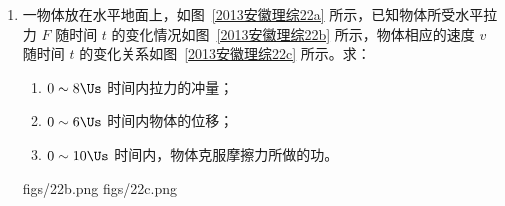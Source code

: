 \documentclass[\gkver]{gaokaozhenti}
\begin{document}
\begin{enumerate}
{（2）按照电路图连接电路如图。


Ⅲ．（1）由图 2 发现在拟合的过程中，80.00 的数据点误差太大，故应剔除。

（2）拟合作图如图所示。


（3）用较远的两点得图线斜率 $k=\frac{1.50-0.70}{180-0}=0.00444$，由闭合电路欧姆定律知 $E_{n}=U_{12}+\frac{U_{12}}{R_0}(R+r)$ 可得 $\frac{1}{U_{12}}=\frac{1}{E_n}+\frac{r}{E_nR_0}+\frac{1}{E_nR_0}R$，所以 $k=\frac{1}{E_nR_0}$，代入 $k$、$R_0$ 值得 $E_{n}=1.50\UV$。
}

\item
一物体放在水平地面上，如图~\ref{2013安徽理综22a} 所示，已知物体所受水平拉力 $F$ 随时间 $t$ 的变化情况如图~\ref{2013安徽理综22b} 所示，物体相应的速度 $v$ 随时间 $t$ 的变化关系如图~\ref{2013安徽理综22c} 所示。求：
\begin{enumerate}
	\item
	$0\sim8\Us$ 时间内拉力的冲量；
	\item
	$0\sim6\Us$ 时间内物体的位移；
	\item
	$0\sim10\Us$ 时间内，物体克服摩擦力所做的功。
\end{enumerate}

{figs/22b.png}
{figs/22c.png}

\jdanswer{
\begin{enumerate}
	\item
	$18\UNs$

	\item
	$6\Um$

	\item
	$30\UJ$

\end{enumerate}
}


\end{enumerate}
\end{document}
